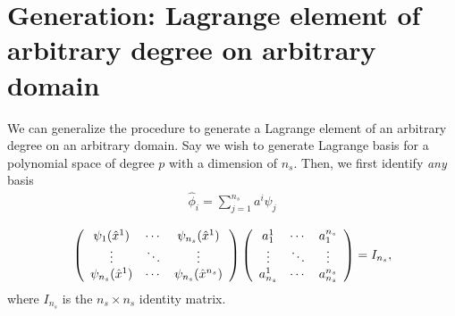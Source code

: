\section{Generation: Lagrange element of arbitrary degree on arbitrary domain}
We can generalize the procedure to generate a Lagrange element of an arbitrary degree on an arbitrary domain.  Say we wish to generate Lagrange basis for a polynomial space of degree $p$ with a dimension of $n_s$.  Then, we first identify \emph{any} basis 
\begin{align*}
  \hat \phi_i = \sum_{j=1}^{n_s} a^i \psi_j
\end{align*}

\begin{align*}
  \bmat{ccc}
  \psi_1(\hat x^1) & \cdots & \psi_{n_s}(\hat x^1) \\
  \vdots & \ddots & \vdots \\
  \psi_{n_s}(\hat x^1) & \cdots & \psi_{n_s}(\hat x^{n_s}) 
  \emat
  \bmat{ccc}
  a^1_1 & \cdots & a^{n_s}_1 \\
  \vdots & \ddots & \vdots \\
  a^1_{n_s} & \cdots & a^{n_s}_{n_s}
  \emat
  =
  I_{n_s},
\end{align*}
where $I_{n_s}$ is the $n_s \times n_s$ identity matrix.

